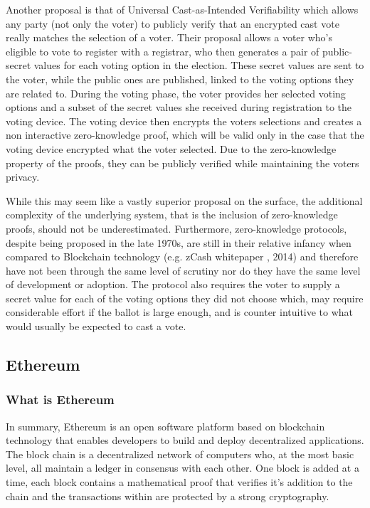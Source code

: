 \documentclass{article}
\begin{document}
Another proposal is that of Universal Cast-as-Intended Verifiability \citep{49_escala_guasch_herranz_morillo_2015} which allows any party (not only the voter) to publicly verify that an encrypted cast vote really matches the selection of a voter. Their proposal allows a voter who's eligible to vote to register with a registrar, who then generates a pair of public-secret values for each voting option in the election. These secret values are sent to the voter, while the public ones are published, linked to the voting options they are related to. During the voting phase, the voter provides her selected voting options and a subset of the secret values she received during registration to the voting device. The voting device then encrypts the voters selections and creates a non interactive zero-knowledge proof, which will be valid only in the case that the voting device encrypted what the voter selected. Due to the zero-knowledge property of the proofs, they can be publicly verified while maintaining the voters privacy.

While this may seem like a vastly superior proposal on the surface, the additional complexity of the underlying system, that is the inclusion of zero-knowledge proofs, should not be underestimated. Furthermore, zero-knowledge protocols, despite being proposed in the late 1970s, are still in their relative infancy when compared to Blockchain technology (e.g. zCash whitepaper \citep{50_ben-sasson_chiesa_garman_green_miers_tromer_virza_2014}, 2014) and therefore have not been through the same level of scrutiny nor do they have the same level of development or adoption. The protocol also requires the voter to supply a secret value for each of the voting options they did not choose which, may require considerable effort if the ballot is large enough, and is counter intuitive to what would usually be expected to cast a vote.

\clearpage
\subsection{Ethereum}
\subsubsection{What is Ethereum}
In summary, Ethereum is an open software platform based on blockchain technology that enables developers to build and deploy decentralized applications. The block chain is a decentralized network of computers who, at the most basic level, all maintain a ledger in consensus with each other. One block is added at a time, each block contains a mathematical proof that verifies it's addition to the chain and the transactions within are protected by a strong cryptography.
 
\end{document}

